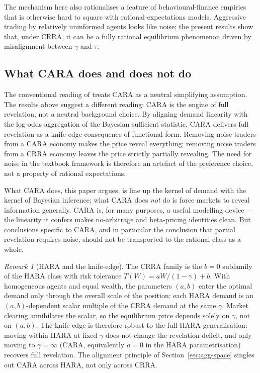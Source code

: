 \documentclass[12pt,letterpaper]{article}
\theoremstyle{definition}
\theoremstyle{remark}
\newtheorem{remark}{Remark}
\newcommand{\1}{\mathbf{1}}
\begin{document}
The mechanism here also rationalises a feature of behavioural-finance
empirics that is otherwise hard to square with rational-expectations
models. Aggressive trading by relatively uninformed agents looks like
noise; the present results show that, under CRRA, it can be a fully
rational equilibrium phenomenon driven by misalignment between $\gamma$
and $\tau$.

\subsection{What CARA does and does not do}

The conventional reading of \citet{GrossmanStiglitz1980} treats CARA as a
neutral simplifying assumption. The results above suggest a different
reading: CARA is the engine of full revelation, not a neutral background
choice. By aligning demand linearity with the log-odds aggregation of the
Bayesian sufficient statistic, CARA delivers full revelation as a
knife-edge consequence of functional form. Removing noise traders from a
CARA economy makes the price reveal everything; removing noise traders
from a CRRA economy leaves the price strictly partially revealing. The
need for noise in the textbook framework is therefore an artefact of the
preference choice, not a property of rational expectations.

What CARA does, this paper argues, is line up the kernel of demand with
the kernel of Bayesian inference; what CARA does \emph{not} do is force
markets to reveal information generally. CARA is, for many purposes, a
useful modelling device --- the linearity it confers makes
no-arbitrage and beta-pricing identities clean. But conclusions specific
to CARA, and in particular the conclusion that partial revelation
requires noise, should not be transported to the rational class as a
whole.

\begin{remark}[HARA and the knife-edge]\label{rem:hara}
The CRRA family is the $b=0$ subfamily of the HARA class with risk
tolerance $T(W)=aW/(1-\gamma)+b$. With homogeneous agents and equal
wealth, the parameters $(a,b)$ enter the optimal demand only through the
overall scale of the position: each HARA demand is an
$(a,b)$-dependent scalar multiple of the CRRA demand at the same
$\gamma$. Market clearing annihilates the scalar, so the equilibrium
price depends solely on $\gamma$, not on $(a,b)$. The knife-edge is
therefore robust to the full HARA generalisation: moving within HARA at
fixed $\gamma$ does not change the revelation deficit, and only moving
to $\gamma=\infty$ (CARA, equivalently $a=0$ in the HARA parametrisation)
recovers full revelation. The alignment principle of
Section~\ref{sec:agg-space} singles out CARA across HARA, not only
across CRRA.
\end{remark}
\end{document}
